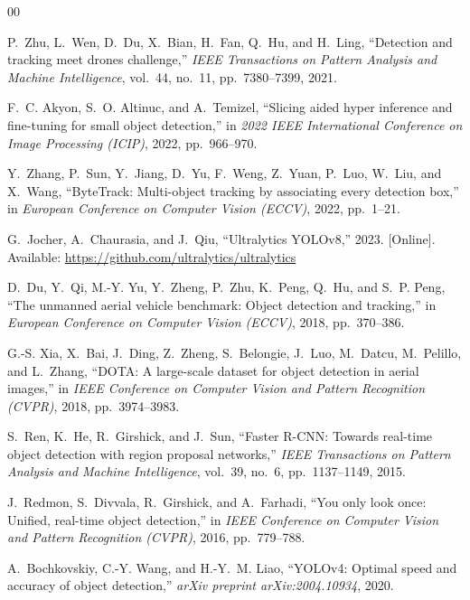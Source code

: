 \documentclass[conference]{IEEEtran}
\begin{document}
\begin{thebibliography}{00}

P.~Zhu, L.~Wen, D.~Du, X.~Bian, H.~Fan, Q.~Hu, and H.~Ling, ``Detection and tracking meet drones challenge,'' \emph{IEEE Transactions on Pattern Analysis and Machine Intelligence}, vol.~44, no.~11, pp.~7380--7399, 2021.

F.~C. Akyon, S.~O. Altinuc, and A.~Temizel, ``Slicing aided hyper inference and fine-tuning for small object detection,'' in \emph{2022 IEEE International Conference on Image Processing (ICIP)}, 2022, pp.~966--970.

Y.~Zhang, P.~Sun, Y.~Jiang, D.~Yu, F.~Weng, Z.~Yuan, P.~Luo, W.~Liu, and X.~Wang, ``ByteTrack: Multi-object tracking by associating every detection box,'' in \emph{European Conference on Computer Vision (ECCV)}, 2022, pp.~1--21.

G.~Jocher, A.~Chaurasia, and J.~Qiu, ``Ultralytics YOLOv8,'' 2023. [Online]. Available: \url{https://github.com/ultralytics/ultralytics}

D.~Du, Y.~Qi, M.-Y. Yu, Y.~Zheng, P.~Zhu, K.~Peng, Q.~Hu, and S.~P. Peng, ``The unmanned aerial vehicle benchmark: Object detection and tracking,'' in \emph{European Conference on Computer Vision (ECCV)}, 2018, pp.~370--386.

G.-S. Xia, X.~Bai, J.~Ding, Z.~Zheng, S.~Belongie, J.~Luo, M.~Datcu, M.~Pelillo, and L.~Zhang, ``DOTA: A large-scale dataset for object detection in aerial images,'' in \emph{IEEE Conference on Computer Vision and Pattern Recognition (CVPR)}, 2018, pp.~3974--3983.

S.~Ren, K.~He, R.~Girshick, and J.~Sun, ``Faster R-CNN: Towards real-time object detection with region proposal networks,'' \emph{IEEE Transactions on Pattern Analysis and Machine Intelligence}, vol.~39, no.~6, pp.~1137--1149, 2015.

J.~Redmon, S.~Divvala, R.~Girshick, and A.~Farhadi, ``You only look once: Unified, real-time object detection,'' in \emph{IEEE Conference on Computer Vision and Pattern Recognition (CVPR)}, 2016, pp.~779--788.

A.~Bochkovskiy, C.-Y. Wang, and H.-Y.~M. Liao, ``YOLOv4: Optimal speed and accuracy of object detection,'' \emph{arXiv preprint arXiv:2004.10934}, 2020.


\end{thebibliography}
\end{document}
